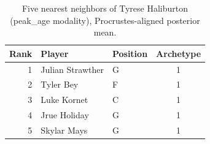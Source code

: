 \begin{table}[htbp]
  \centering\small
  \begin{tabular}{rllc}
    \toprule
    Rank & Player & Position & Archetype \\
    \midrule
    1 & Julian Strawther & G & 1 \\
    2 & Tyler Bey & F & 1 \\
    3 & Luke Kornet & C & 1 \\
    4 & Jrue Holiday & G & 1 \\
    5 & Skylar Mays & G & 1 \\
    \bottomrule
  \end{tabular}
  \caption{Five nearest neighbors of Tyrese Haliburton (peak_age modality), Procrustes-aligned posterior mean.}
  \label{tab:Tyrese_Haliburton_neighbors_peak_age}
\end{table}

